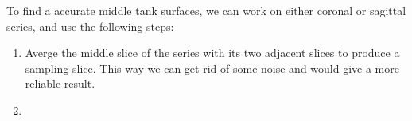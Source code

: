 To find a accurate middle tank surfaces, we can work on either coronal or sagittal series, and use the
following steps:

\begin{enumerate}
\item Averge the middle slice of the series with its two adjacent slices to produce a sampling slice. This 
  way we can get rid of some noise and would give a more reliable result.
\item 
\end{enumerate}